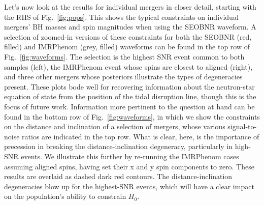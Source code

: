 \documentclass[twocolumn]{aastex63}
\begin{document}
\begin{figure*}[ht!]
\caption{Blah.\label{fig:cosmo}}
\end{figure*}

Let's now look at the results for individual mergers in closer detail, starting with the RHS of Fig.~\ref{fig:pops}. This shows the typical constraints on individual mergers' BH masses and spin magnitudes when using the SEOBNR waveform. A selection of zoomed-in versions of these constraints for both the SEOBNR (red, filled) and IMRPhenom (grey, filled) waveforms can be found in the top row of Fig.~\ref{fig:waveforms}. The selection is the highest SNR event common to both samples (left), the IMRPhenom event whose spins are closest to aligned (right), and three other mergers whose posteriors illustrate the types of degeneracies present. These plots bode well for recovering information about the neutron-star equation of state from the position of the tidal disruption line, though this is the focus of future work. Information more pertinent to the question at hand can be found in the bottom row of Fig.~\ref{fig:waveforms}, in which we show the constraints on the distance and inclination of a selection of mergers, whose various signal-to-noise ratios are indicated in the top row. What is clear, here, is the importance of precession in breaking the distance-inclination degeneracy, particularly in high-SNR events. We illustrate this further by re-running the IMRPhenom cases assuming aligned spins, having set their x and y spin components to zero. These results are overlaid as dashed dark red contours. The distance-inclination degeneracies blow up for the highest-SNR events, which will have a clear impact on the population's ability to constrain $H_0$.

\begin{figure*}[ht!]
\caption{Posterior distributions for mergers simulated using the IMRPhenom waveform with precessing (grey filled) and aligned (dark red dashed) spins, and the SEOBNR waveform (red) with aligned spins. Each column depicts the distance, inclination, and black-hole mass and $z$-spin magnitude posteriors for a merger with true parameters indicated by black plus symbols (crosses where the true $z$-spin is negative). Shown are: (left) the merger with the highest signal-to-noise, (right) the two IMRPhenom mergers whose black-hole spins are closest to being aligned, and (center) two further mergers indicating the range of posteriors observed. \label{fig:waveforms}}
\end{figure*}
\end{document}
